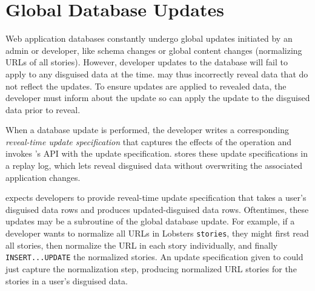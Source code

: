 \section{Global Database Updates} 
\label{s:overview:updates}

Web application databases constantly undergo global updates 
initiated by an admin or developer, like schema changes or global content
changes (\eg normalizing URLs of all stories). 
%
However, developer updates to the database will fail to apply to any disguised
data at the time. \sys may thus incorrectly reveal data that do not
reflect the updates. 
%
To ensure updates are applied to revealed data, the developer must inform \sys
about the update so \sys can apply the update to the disguised data prior to
reveal.

When a database update is performed, the developer writes a corresponding
\emph{reveal-time update specification} that captures the effects of the operation and
invokes \sys's API with the update specification.
\sys stores these update specifications in a replay log, which lets \sys reveal
disguised data without overwriting the associated application changes.
%
%

%

%
\sys expects developers to provide reveal-time update specification that takes
a user's disguised data rows and produces updated-disguised data rows.
%
Oftentimes, these updates may be a subroutine of the global
database update. 
%
For example, if a developer wants to normalize all URLs in Lobsters
\texttt{stories}, they might first read all stories, then normalize the URL in
each story individually, and finally \texttt{INSERT...UPDATE} the normalized
stories. 
%
An update specification given to \sys could just capture the normalization step,
producing normalized URL stories for the stories in a user's disguised data.
%

